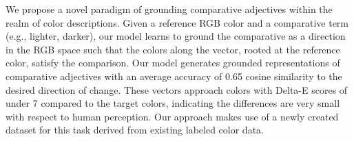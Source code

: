 We propose a novel paradigm of grounding comparative adjectives within the realm of color descriptions. Given a reference RGB color and a comparative term (e.g., lighter, darker), our model learns to ground the comparative as a direction in the RGB space such that the colors along the vector, rooted at the reference color, satisfy the comparison. Our model generates grounded representations of comparative adjectives with an average accuracy of 0.65 cosine similarity to the desired direction of change. These vectors approach colors with Delta-E scores of under 7 compared to the target colors, indicating the differences are very small with respect to human perception. Our approach makes use of a newly created dataset for this task derived from existing labeled color data.
